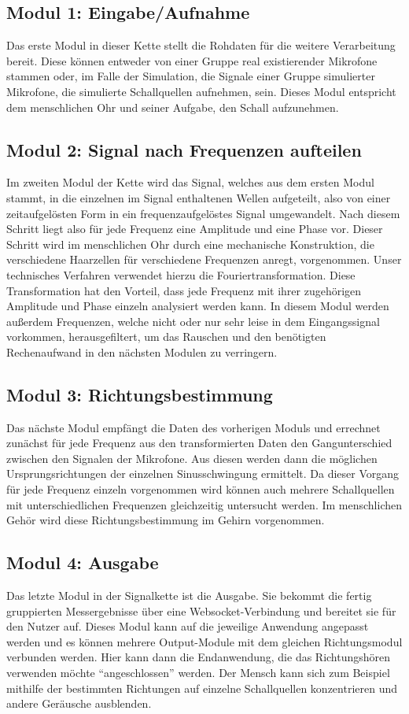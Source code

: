 \subsection{Modul 1: Eingabe/Aufnahme}
Das erste Modul in dieser Kette stellt die Rohdaten für die weitere Verarbeitung bereit. Diese  können entweder von einer Gruppe real existierender Mikrofone stammen oder, im Falle der Simulation, die Signale einer Gruppe simulierter Mikrofone, die simulierte Schallquellen aufnehmen, sein. Dieses Modul entspricht dem menschlichen Ohr und seiner Aufgabe, den Schall aufzunehmen. 

\subsection{Modul 2: Signal nach Frequenzen aufteilen}
Im zweiten Modul der Kette wird das Signal, welches aus dem ersten Modul stammt, in die einzelnen im Signal enthaltenen Wellen aufgeteilt, also von einer zeitaufgelösten Form in ein frequenzaufgelöstes Signal umgewandelt. Nach diesem Schritt liegt also für jede Frequenz eine Amplitude und eine Phase vor. Dieser Schritt wird im menschlichen Ohr durch eine mechanische Konstruktion, die verschiedene Haarzellen für verschiedene Frequenzen anregt, vorgenommen. Unser technisches Verfahren verwendet hierzu die Fouriertransformation. Diese Transformation hat den Vorteil, dass jede Frequenz mit ihrer zugehörigen Amplitude und Phase einzeln analysiert werden kann. 
In diesem Modul werden außerdem Frequenzen, welche nicht oder nur sehr leise in dem Eingangssignal vorkommen, herausgefiltert, um das Rauschen und den benötigten Rechenaufwand in den nächsten Modulen zu verringern.

\subsection{Modul 3: Richtungsbestimmung}
Das nächste Modul empfängt die Daten des vorherigen Moduls und errechnet zunächst für jede Frequenz aus den transformierten Daten den Gangunterschied zwischen den Signalen der Mikrofone. Aus diesen werden dann die möglichen Ursprungsrichtungen der einzelnen Sinusschwingung ermittelt. Da dieser Vorgang für jede Frequenz einzeln vorgenommen wird können auch mehrere Schallquellen mit unterschiedlichen Frequenzen gleichzeitig untersucht werden. Im menschlichen Gehör wird diese Richtungsbestimmung im Gehirn vorgenommen.

\subsection{Modul 4: Ausgabe}
Das letzte Modul in der Signalkette ist die Ausgabe. Sie bekommt die fertig gruppierten Messergebnisse über eine Websocket-Verbindung und bereitet sie für den Nutzer auf. Dieses Modul kann auf die jeweilige Anwendung angepasst werden und es können mehrere Output-Module mit dem gleichen Richtungsmodul verbunden werden. Hier kann dann die Endanwendung, die das Richtungshören verwenden möchte ``angeschlossen'' werden. Der Mensch kann sich zum Beispiel mithilfe der bestimmten Richtungen auf einzelne Schallquellen konzentrieren und andere Geräusche ausblenden.